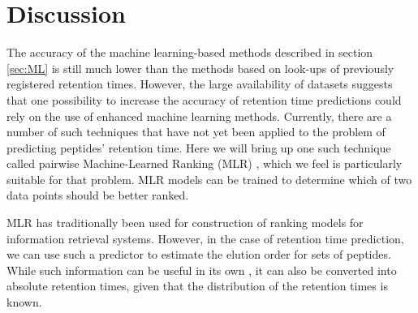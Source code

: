 \documentclass[a4paper]{article}
\begin{document}




\section{Discussion}

The accuracy of the machine learning-based methods described in
section \ref{sec:ML} is still much lower than the methods based on
look-ups of previously registered retention times. However, the large
availability of datasets suggests that one possibility to increase the
accuracy of retention time predictions could rely on the use of
enhanced machine learning methods. Currently, there are a number of
such techniques that have not yet been applied to the problem of
predicting peptides' retention time. Here we will bring up one such
technique called pairwise Machine-Learned Ranking (MLR)
\cite{liu2009learning}, which we feel is particularly suitable for
that problem. MLR models can be trained to determine which of two data
points should be better ranked. 

MLR has traditionally been used for construction of ranking models for
information retrieval systems. However, in the case of retention time
prediction, we can use such a predictor to estimate the elution order
for sets of peptides. While such information can be useful in its own
\cite{bailey2012instant}, it can also be converted into absolute
retention times, given that the distribution of the retention times is
known.
\end{document}
